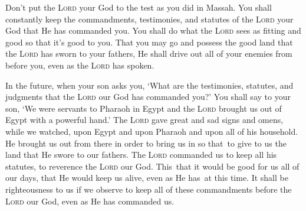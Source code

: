 \begin{inparaenum}
   Don't put the \textsc{Lord} your God to the test as you did in Massah.%
   You shall constantly keep the commandments, testimonies, and statutes of the \textsc{Lord} your God that He has commanded you.%
   You shall do what the \textsc{Lord} sees as fitting and good so that it's good to you. That you may go and possess the good land that the \textsc{Lord} has sworn to your fathers,%
   He shall drive out all of your enemies from before you, even as the \textsc{Lord} has spoken.%
  
   In the future, when your son asks you, `What are the testimonies, statutes, and judgments that the \textsc{Lord} our God has commanded you?'%
   You shall say to your son, `We were servants to Pharaoh in Egypt and the \textsc{Lord} brought us out of Egypt with a powerful hand.'%
   The \textsc{Lord} gave great and sad signs and omens, while we watched, upon Egypt and upon Pharaoh and upon all of his household.%
   He brought us out from there in order to bring us in so that\understood\ to give to us the land that He swore to our fathers.%
   The \textsc{Lord} commanded us to keep all his statutes, to reverence the \textsc{Lord} our God. This\understood\ that it would be good for us all of our days, that He would keep us alive, even as He has\understood\ at this time.%
   It shall be righteousness to us if we observe to keep all of these commandments before the \textsc{Lord} our God, even as He has commanded us.%
\end{inparaenum}
